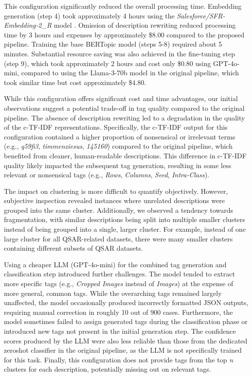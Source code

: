 This configuration significantly reduced the overall processing time. Embedding generation (step 4) took approximately 4 hours using the \textit{Salesforce/SFR-Embedding-2\_R} model \cite{noauthor_salesforcesfr-embedding-2_r_2024}. Omission of description rewriting reduced processing time by 3 hours and expenses by approximately \$8.00 compared to the proposed pipeline. Training the base BERTopic model (steps 5-8) required about 5 minutes. Substantial resource saving was also achieved in the fine-tuning step (step 9), which took approximately 2 hours and cost only \$0.80 using GPT-4o-mini, compared to using the Llama-3-70b model in the original pipeline, which took similar time but cost approximately \$4.80.

While this configuration offers significant cost and time advantages, our initial observations suggest a potential trade-off in tag quality compared to the original pipeline. The absence of description rewriting led to a degradation in the quality of the c-TF-IDF representations. Specifically, the c-TF-IDF output for this configuration contained a higher proportion of nonsensical or irrelevant terms (e.g., \textit{q59fi3}, \textit{timmenziesus}, \textit{145160}) compared to the original pipeline, which benefited from cleaner, human-readable descriptions. This difference in c-TF-IDF quality likely impacted the subsequent tag generation, resulting in some less relevant or nonsensical tags (e.g., \textit{Rows}, \textit{Columns}, \textit{Seed}, \textit{Intra-Class}).

The impact on clustering is more difficult to quantify objectively. However, subjective inspection revealed instances where unrelated descriptions were grouped into the same cluster. Additionally, we observed a tendency towards fragmentation, with similar descriptions being split into multiple smaller clusters instead of being grouped into a single, larger cluster. For example, instead of one large cluster for all QSAR-related datasets, there were many smaller clusters containing different subsets of QSAR datasets.

Using a cheaper LLM (GPT-4o-mini) for the combined tag generation and classification step introduced further challenges. The model tended to extract more specific tags (e.g., \textit{Cropped Images} instead of \textit{Images}) at the expense of more general, common tags. While the overarching tags remained largely unaffected, the model occasionally produced incorrectly formatted JSON outputs, requiring manual correction in roughly 10 out of 900 cases. Furthermore, the model sometimes failed to assign generated tags during the classification phase or introduced new tags not present in the initial generation step. The confidence scores produced by the LLM were also less reliable than those from the dedicated zeroshot classifier in the original pipeline, as the LLM is not specifically trained for this task. Finally, this configuration does not provide tags from the top \textit{n} clusters for each description, potentially missing out on relevant tags.

